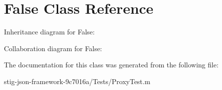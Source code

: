 \hypertarget{interface_false}{
\section{\-False \-Class \-Reference}
\label{interface_false}
}


\-Inheritance diagram for \-False\-:


\-Collaboration diagram for \-False\-:


\-The documentation for this class was generated from the following file\-:\begin{DoxyCompactItemize}
\item 
stig-\/json-\/framework-\/9c7016a/\-Tests/\-Proxy\-Test.\-m\end{DoxyCompactItemize}
